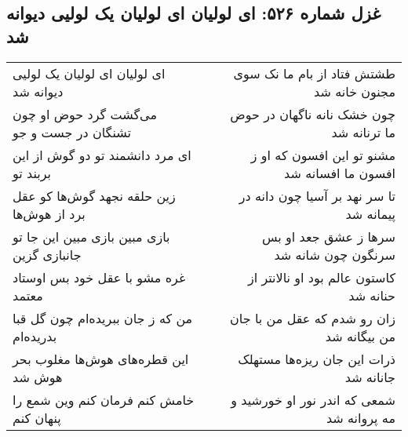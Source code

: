 \begin{center}
\section*{غزل شماره ۵۲۶: ای لولیان ای لولیان یک لولیی دیوانه شد}
\label{sec:0526}
\begin{longtable}{l p{0.5cm} r}
ای لولیان ای لولیان یک لولیی دیوانه شد
&&
طشتش فتاد از بام ما نک سوی مجنون خانه شد
\\
می‌گشت گرد حوض او چون تشنگان در جست و جو
&&
چون خشک نانه ناگهان در حوض ما ترنانه شد
\\
ای مرد دانشمند تو دو گوش از این بربند تو
&&
مشنو تو این افسون که او ز افسون ما افسانه شد
\\
زین حلقه نجهد گوش‌ها کو عقل برد از هوش‌ها
&&
تا سر نهد بر آسیا چون دانه در پیمانه شد
\\
بازی مبین بازی مبین این جا تو جانبازی گزین
&&
سرها ز عشق جعد او بس سرنگون چون شانه شد
\\
غره مشو با عقل خود بس اوستاد معتمد
&&
کاستون عالم بود او نالانتر از حنانه شد
\\
من که ز جان ببریده‌ام چون گل قبا بدریده‌ام
&&
زان رو شدم که عقل من با جان من بیگانه شد
\\
این قطره‌های هوش‌ها مغلوب بحر هوش شد
&&
ذرات این جان ریزه‌ها مستهلک جانانه شد
\\
خامش کنم فرمان کنم وین شمع را پنهان کنم
&&
شمعی که اندر نور او خورشید و مه پروانه شد
\\
\end{longtable}
\end{center}
